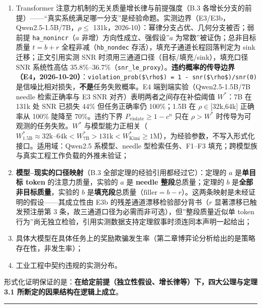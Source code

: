 \begin{enumerate}
\def\labelenumi{\arabic{enumi}.}
\tightlist
\item
  Transformer 注意力机制的无关质量增长律与前提强度（B.3
  各增长分支的前提）------``真实系统满足哪一分支''是经验命题。实测边界（E3/E3b，Qwen2.5-1.5B/7B，\(\rho\)\(\le\)
  131k，2026-10）：幂律分支占优、几何分支被否；弱前提
  \texttt{ha\_nonincr}（\(a\) 非增）方向性成立、强假设''\(a\)
  为常数''被证伪；总非目标质量 \(t=b+r\) 全程非减（\texttt{hb\_nondec}
  存活），填充子通道长程回落判定为 sink 迁移；正文引用实测 SNR
  时须用三通道口径（目标/填充/sink），填充口径 SNR 系统性高估
  35.8\%--36.7\%（\texttt{snr\_le\_proxy}）。\textbf{违约概率的传导边界（E4，2026-10-20）}：\texttt{violation\_prob(\$\textbackslash{}rho\$)\ =\ 1\ -\ snr(\$\textbackslash{}rho\$)/snr(0)}
  是信噪比相对损失，\textbf{不是}任务失败概率。E4
  端到端实验（Qwen2.5-1.5B/7B needle 检索正确率与 E3 SNR
  对齐）表明两者之间存在补偿阈值 \(W^*\)：7B 在 131k 处 SNR 已损失 44\%
  但任务正确率仍 100\%；1.5B 在 \(\rho\)\(\in\){[}32k,64k{]} 正确率从
  100\% 陡降至 70\%。违约下界 \(P_{\text{violate}} \ge 1 - c^n\) 只在
  \(\rho > W^*\) 时传导为可观测的任务失败。\(W^*\)
  与模型能力正相关（\(W^*_{1.5\text{B}} \approx 32\text{k–64k} < W^*_{7\text{B}} > 131\text{k} < W^*_{\text{Kimi}} \ge 1\text{M}\)），为经验参数，不写入形式化接口。适用域：Qwen2.5
  系模型、needle 型检索任务、F1--F3
  填充；跨模型族与真实工程工作负载的外推未验证；
\item
  \textbf{模型--现实的口径映射}（B.3
  全部定理的经验引用都经过它）：定理的 \(a\) 是\textbf{单目标 token}
  的注意力质量，实验的 \(a\) 是 \textbf{needle 整段}总质量；定理的 \(b\)
  是\textbf{全部非目标质量}，实验的 \(b\)
  是\textbf{填充段}总质量（\(\mathrm{filler}=b-r\)）。这两条映射是未经证明的假设------其成立性由
  E3b 的残差通道漂移检验部分背书（\(r\) 显著漂移已触发预注册第 3
  条，故三通道口径为必需而非可选），但''整段质量近似单 token
  行为''尚无独立检验，引用实测数据支持定理叙事时须连同本声明一起给出；
\item
  具体大模型在具体任务上的奖励欺骗发生率（第二章博弈论分析给出的是策略存在性，非发生率）；
\item
  工业工程中契约违规的实测分布。
\end{enumerate}

形式化证明保证的是：\textbf{在给定前提（独立性假设、增长律等）下，四大公理与定理
3.1 所断定的因果结构在逻辑上成立}。

\begin{center}\rule{0.5\linewidth}{0.5pt}\end{center}

